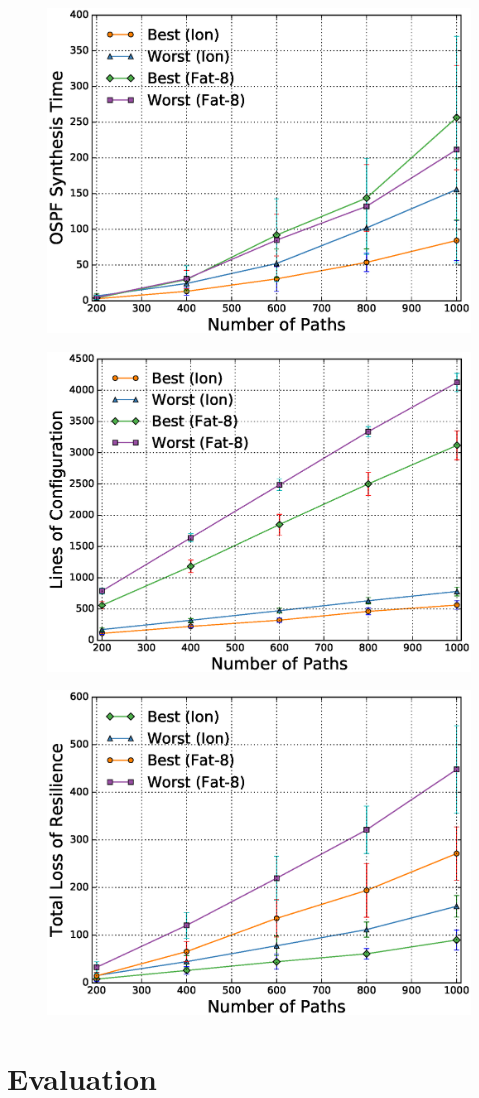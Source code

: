 \begin{figure}[t]
	\centering
	\includegraphics[width=0.7\columnwidth]{figures/ospfSynthesisTimeMCMC.eps}
	\label{fig:ospfmcmc}
\end{figure}


\begin{figure}[t]
	\centering
	\includegraphics[width=0.7\columnwidth]{figures/confMCMC.eps}
	\label{fig:confmcmc}
\end{figure}

\begin{figure}[t]
	\centering
	\includegraphics[width=0.7\columnwidth]{figures/TRLMCMC.eps}
	\label{fig:trlmcmc}
\end{figure}



\section{Evaluation}